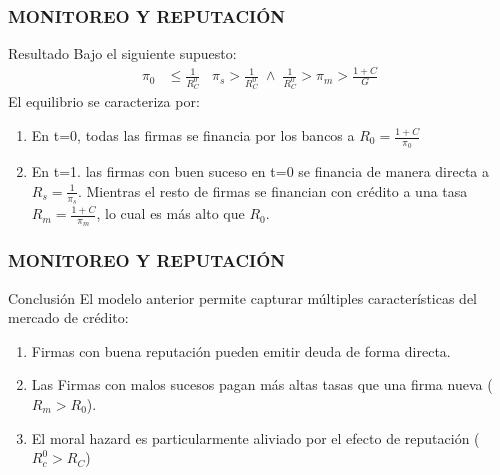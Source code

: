 \begin{frame}
    \frametitle{{\normalsize MONITOREO Y REPUTACIÓN} {}}
   
   
  \begin{block} {Resultado}
  Bajo el siguiente supuesto:
    \begin{align}
    \pi_{0}&\leq \frac{1}{R_{C}^{0}}\;\;\;\pi_{s}> \frac{1}{R_{C}^{0}}\;\wedge\;\frac{1}{R_{C}^{0}}>\pi_{m}>\frac{1+C}{G}
    \end{align}  
    El equilibrio se caracteriza por:
    \begin{enumerate}
        \item En t=0, todas las firmas se financia por los bancos a $R_{0}=\frac{1+C}{\pi_{0}}$
        \item En t=1. las firmas con buen suceso en t=0 se financia de manera directa a 
        $R_{s}=\frac{1}{\pi_{s}}$. Mientras el resto de firmas se financian con crédito a una tasa $R_{m}=\frac{1+C}{\pi_{m}}$, lo cual es más alto que $R_{0}$.
        
    \end{enumerate}  
  \end{block}	
   
\end{frame}


\begin{frame}
    \frametitle{{\normalsize MONITOREO Y REPUTACIÓN} {}}
      
    \begin{block} {Conclusión}
        El modelo anterior permite capturar múltiples características del mercado de crédito:
       \begin{enumerate}
           \item Firmas con buena reputación pueden emitir deuda de forma directa.
           \item Las Firmas con malos sucesos pagan más altas tasas que una firma nueva ($ R_{m}>R_{0}$).
           \item El moral hazard es particularmente aliviado por el efecto de reputación  ($R_{c}^{0}>R_{C}$)
       \end{enumerate}
    \end{block}	
    
\end{frame}

